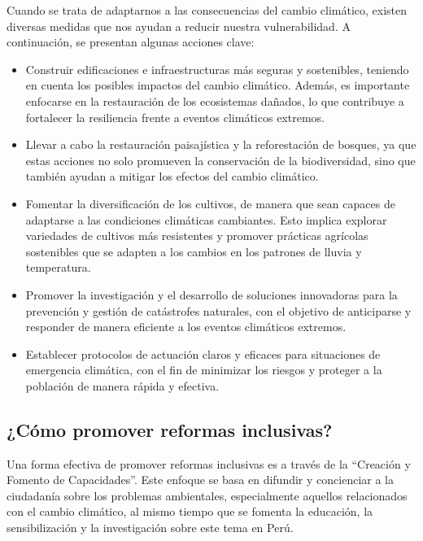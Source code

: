 \documentclass[
  letterpaper,
  DIV=11,
  numbers=noendperiod]{scrartcl}
\providecommand{\tightlist}{%
  \setlength{\itemsep}{0pt}\setlength{\parskip}{0pt}}\usepackage{longtable,booktabs,array}
\begin{document}
Cuando se trata de adaptarnos a las consecuencias del cambio climático,
existen diversas medidas que nos ayudan a reducir nuestra
vulnerabilidad. A continuación, se presentan algunas acciones clave:

\begin{itemize}
\tightlist
\item
  Construir edificaciones e infraestructuras más seguras y sostenibles,
  teniendo en cuenta los posibles impactos del cambio climático. Además,
  es importante enfocarse en la restauración de los ecosistemas dañados,
  lo que contribuye a fortalecer la resiliencia frente a eventos
  climáticos extremos.
\item
  Llevar a cabo la restauración paisajística y la reforestación de
  bosques, ya que estas acciones no solo promueven la conservación de la
  biodiversidad, sino que también ayudan a mitigar los efectos del
  cambio climático.
\item
  Fomentar la diversificación de los cultivos, de manera que sean
  capaces de adaptarse a las condiciones climáticas cambiantes. Esto
  implica explorar variedades de cultivos más resistentes y promover
  prácticas agrícolas sostenibles que se adapten a los cambios en los
  patrones de lluvia y temperatura.
\item
  Promover la investigación y el desarrollo de soluciones innovadoras
  para la prevención y gestión de catástrofes naturales, con el objetivo
  de anticiparse y responder de manera eficiente a los eventos
  climáticos extremos.
\item
  Establecer protocolos de actuación claros y eficaces para situaciones
  de emergencia climática, con el fin de minimizar los riesgos y
  proteger a la población de manera rápida y efectiva.
\end{itemize}

\hypertarget{cuxf3mo-promover-reformas-inclusivas}{%
\subsection{¿Cómo promover reformas
inclusivas?}\label{cuxf3mo-promover-reformas-inclusivas}}

Una forma efectiva de promover reformas inclusivas es a través de la
``Creación y Fomento de Capacidades''. Este enfoque se basa en difundir
y concienciar a la ciudadanía sobre los problemas ambientales,
especialmente aquellos relacionados con el cambio climático, al mismo
tiempo que se fomenta la educación, la sensibilización y la
investigación sobre este tema en Perú.
\end{document}
